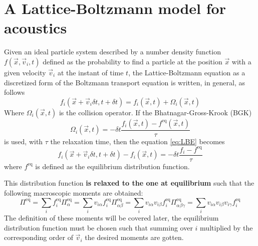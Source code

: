 \chapter{A Lattice-Boltzmann model for acoustics}

Given an ideal particle system described by a number density function $f(\vec x, \vec v_i, t)$ defined as the probability to find a particle at the position $\vec x$ with a given velocity $\vec v_i$ at the instant of time $t$, the Lattice-Boltzmann equation as a discretized form of the Boltzmann transport equation is written, in general, as follows
\begin{equation}\label{eq:LBE}
    f_i(\vec x + \vec v_i \delta t, t + \delta t) = f_i(\vec x, t) + \Omega_i(\vec x, t)    
\end{equation}
Where $\Omega_i(\vec x,t)$ is the collision operator. If the Bhatnagar-Gross-Krook (BGK)
\begin{equation}\label{eq:BGK}
    \Omega_i(\vec x,t) = -\delta t\frac{f_i(\vec x, t) - f^{\text{eq}}(\vec x, t)}{\tau}
\end{equation}
is used, with $\tau$ the relaxation time, then the equation \ref{eq:LBE} becomes
\begin{equation}\label{eq:LBE_BGK}
    f_i(\vec x + \vec v_i \delta t, t + \delta t) - f_i(\vec x, t) = -\delta t\frac{f_i - f^{\text{eq}}}{\tau}
\end{equation}
where $f^{\text{eq}}$ is defined as the equilibrium distribution function.

This distribution function \textbf{is relaxed to the one at equilibrium} such that the following macroscopic moments are obtained:
\begin{subequations}\label{eqs:moments}
\begin{equation}
    \Pi^{\text{eq}} = \sum_i f_i^{\text{eq}} \label{eq:moment0}
\end{equation}
\begin{equation}
    \Pi^{\text{eq}}_{\alpha} = \sum_i v_{i\alpha}f_i^{\text{eq}}\label{eq:moment1}
\end{equation}
\begin{equation}
    \Pi^{\text{eq}}_{\alpha\beta} = \sum_i v_{i\alpha}v_{i\beta}f_i^{\text{eq}}\label{eq:moment2}
\end{equation}
\begin{equation}
    \Pi^{\text{eq}}_{\alpha\beta\gamma} = \sum_i v_{i\alpha}v_{i\beta}v_{i\gamma}f_i^{\text{eq}}\label{eq:moment3}
\end{equation}
\end{subequations}
The definition of these moments will be covered later, the equilibrium distribution function must be chosen such that summing over $i$ multiplied by the corresponding order of $\vec v_i$ the desired moments are gotten.

